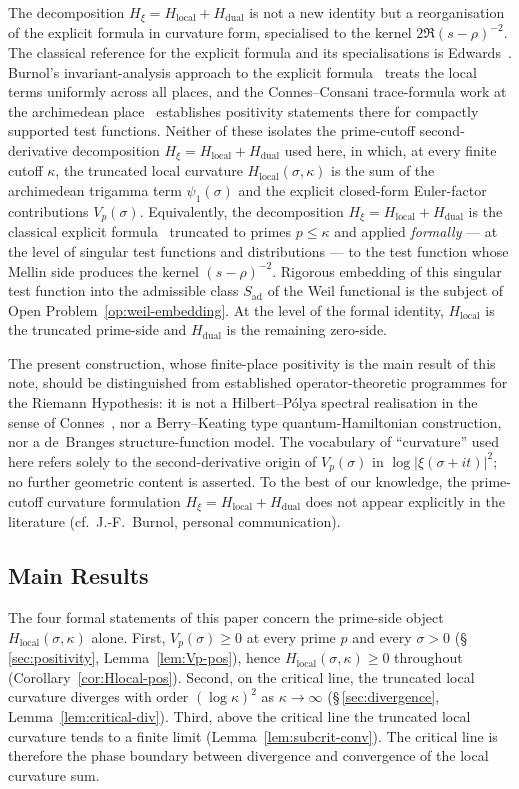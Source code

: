 \documentclass[11pt]{article}
\newcommand{\Hxi}{H_{\xi}}
\newcommand{\Hlocal}{H_{\mathrm{local}}}
\newcommand{\Hdual}{H_{\mathrm{dual}}}
\newcommand{\Sad}{S_{\mathrm{ad}}}
\begin{document}
The decomposition
$\Hxi=\Hlocal+\Hdual$ is not a new identity but a
reorganisation of the explicit formula in curvature form,
specialised to the kernel $2\Re(s-\rho)^{-2}$.
The classical reference for the explicit formula and its
specialisations is Edwards~\cite{Edwards}.
Burnol's invariant-analysis approach to the explicit
formula~\cite{Burnol} treats the local terms uniformly across
all places, and the Connes--Consani trace-formula work at the
archimedean place~\cite{ConnesConsani} establishes positivity
statements there for compactly supported test functions.
Neither of these isolates the prime-cutoff second-derivative
decomposition $\Hxi=\Hlocal+\Hdual$ used here, in which, at
every finite cutoff $\kappa$, the truncated local curvature
$\Hlocal(\sigma,\kappa)$ is the sum of the archimedean
trigamma term $\psi_1(\sigma)$ and the explicit closed-form
Euler-factor contributions $V_p(\sigma)$.
Equivalently, the decomposition $\Hxi=\Hlocal+\Hdual$ is the
classical explicit formula~\cite{Edwards} truncated to primes
$p\le\kappa$ and applied \emph{formally} --- at the level of
singular test functions and distributions --- to the test
function whose Mellin side produces the kernel $(s-\rho)^{-2}$.
Rigorous embedding of this singular test function into the
admissible class $\Sad$ of the Weil functional is the subject
of Open Problem~\ref{op:weil-embedding}.
At the level of the formal identity, $\Hlocal$ is the
truncated prime-side and $\Hdual$ is the remaining zero-side.

The present construction, whose finite-place positivity is
the main result of this note, should be distinguished from
established operator-theoretic programmes for the Riemann
Hypothesis: it is not a Hilbert--P\'olya spectral realisation
in the sense of Connes~\cite{Connes}, nor a Berry--Keating
type quantum-Hamiltonian construction, nor a de~Branges
structure-function model.
The vocabulary of ``curvature'' used here refers solely to the
second-derivative origin of $V_p(\sigma)$ in
$\log\lvert\xi(\sigma+it)\rvert^{2}$; no further geometric
content is asserted.
To the best of our knowledge, the prime-cutoff curvature
formulation $\Hxi=\Hlocal+\Hdual$ does not appear explicitly
in the literature (cf.\ J.-F.~Burnol, personal communication).

\subsection{Main Results}
\label{sec:main}

The four formal statements of this paper concern the
prime-side object $\Hlocal(\sigma,\kappa)$ alone.
First, $V_p(\sigma)\ge 0$ at every prime $p$ and every
$\sigma>0$ (\S\,\ref{sec:positivity}, Lemma~\ref{lem:Vp-pos}),
hence $\Hlocal(\sigma,\kappa)\ge 0$ throughout
(Corollary~\ref{cor:Hlocal-pos}).
Second, on the critical line, the truncated local curvature
diverges with order $(\log\kappa)^{2}$ as $\kappa\to\infty$
(\S\,\ref{sec:divergence}, Lemma~\ref{lem:critical-div}).
Third, above the critical line the truncated local curvature
tends to a finite limit
(Lemma~\ref{lem:subcrit-conv}).
The critical line is therefore the phase boundary between
divergence and convergence of the local curvature sum.
\end{document}
